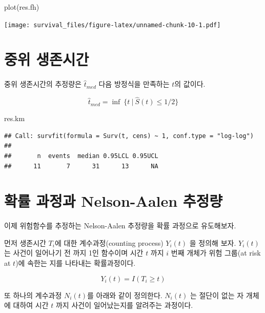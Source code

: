 \documentclass[
]{book}
\newenvironment{Shaded}{\begin{snugshade}}{\end{snugshade}}
\newcommand{\FunctionTok}[1]{\textcolor[rgb]{0.00,0.00,0.00}{#1}}
\newcommand{\NormalTok}[1]{#1}
\theoremstyle{definition}
\theoremstyle{definition}
\theoremstyle{definition}
\theoremstyle{definition}
\theoremstyle{remark}
\begin{document}
\begin{Shaded}
\begin{Highlighting}[]
\FunctionTok{plot}\NormalTok{(res.fh)}
\end{Highlighting}
\end{Shaded}

\texttt{[image: survival\_files/figure-latex/unnamed-chunk-10-1.pdf]}

\hypertarget{uxc911uxc704-uxc0dduxc874uxc2dcuxac04}{%
\section{중위 생존시간}\label{uxc911uxc704-uxc0dduxc874uxc2dcuxac04}}

중위 생존시간의 추정량은 \(\hat t_{med}\) 다음 방정식을 만족하는 \(t\)의 값이다.

\[ \hat t_{med} = \inf ~ \{t~|~ \hat S(t) \le 1/2 \} \]

\begin{Shaded}
\begin{Highlighting}[]
\NormalTok{res.km}
\end{Highlighting}
\end{Shaded}

\begin{verbatim}
## Call: survfit(formula = Surv(t, cens) ~ 1, conf.type = "log-log")
## 
##       n  events  median 0.95LCL 0.95UCL 
##      11       7      31      13      NA
\end{verbatim}

\hypertarget{uxd655uxb960-uxacfcuxc815uxacfc-nelson-aalen-uxcd94uxc815uxb7c9}{%
\section{확률 과정과 Nelson-Aalen 추정량}\label{uxd655uxb960-uxacfcuxc815uxacfc-nelson-aalen-uxcd94uxc815uxb7c9}}

이제 위험함수를 추정하는 Nelson-Aalen 추정량을 확률 과정으로 유도해보자.

먼저 생존시간 \(T_i\)에 대한 계수과정(counting process) \(Y_i(t)\) 을 정의해 보자.
\(Y_i(t)\) 는 사건이 일어나기 전 까지 1인 함수이며 시간 \(t\) 까지 \(i\) 번째 개체가 위험 그룹(at risk at \(t\))에 속한는 지를 나타내는 확률과정이다.

\[ Y_i(t) = I(T_i \ge t)\]

또 하나의 계수과정 \(N_i(t)\)를 아래와 같이 정의한다. \(N_i(t)\) 는 절단이 없는 자 개체에 대하여 시간 \(t\) 까지 사건이 일어났는지를 알려주는 과정이다.
\end{document}
